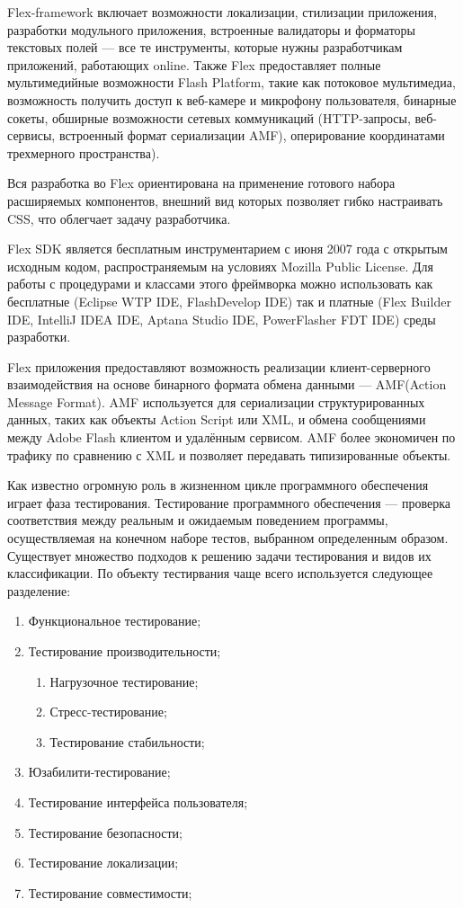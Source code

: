 Flex-framework включает возможности локализации, стилизации приложения, разработки модульного приложения, 
встроенные валидаторы и форматоры текстовых полей --- все те инструменты, которые нужны разработчикам
приложений, работающих online. Также Flex предоставляет полные мультимедийные возможности Flash 
Platform, такие как потоковое мультимедиа, возможность получить доступ к веб-камере и микрофону
пользователя, бинарные сокеты, обширные возможности сетевых коммуникаций (HTTP-запросы, веб-сервисы, 
встроенный формат сериализации AMF), оперирование координатами трехмерного пространства).

Вся разработка во Flex ориентирована на применение готового набора расширяемых компонентов,
внешний вид которых позволяет гибко настраивать CSS, что облегчает задачу разработчика.

Flex SDK является бесплатным инструментарием с июня 2007 года с открытым исходным кодом,
распространяемым на условиях Mozilla Public License. Для работы с процедурами и классами этого фреймворка
можно использовать как бесплатные (Eclipse WTP IDE, FlashDevelop IDE) так и платные
(Flex Builder IDE, IntelliJ IDEA IDE, Aptana Studio IDE, PowerFlasher FDT IDE) среды разработки.

Flex приложения предоставляют возможность реализации клиент-серверного взаимодействия 
на основе бинарного формата обмена данными --- AMF(Action Message Format). AMF
используется для сериализации структурированных данных, таких как объекты Action Script 
или XML, и обмена сообщениями между Adobe Flash клиентом и удалённым сервисом. 
AMF более экономичен по трафику по сравнению с XML и позволяет передавать типизированные объекты.

Как известно огромную роль в жизненном цикле программного обеспечения играет фаза тестирования.
Тестирование программного обеспечения — проверка соответствия между реальным и ожидаемым поведением программы,
осуществляемая на конечном наборе тестов, выбранном определенным образом.
Существует множество подходов к решению задачи тестирования и видов их классификации. По объекту тестирвания чаще всего
используется следующее разделение:

\begin{enumerate}
\item Функциональное тестирование;
\item Тестирование производительности;
\begin{enumerate}
\item Нагрузочное тестирование;
\item Стресс-тестирование;
\item Тестирование стабильности;
\end{enumerate}
\item Юзабилити-тестирование;
\item Тестирование интерфейса пользователя;
\item Тестирование безопасности;
\item Тестирование локализации;
\item Тестирование совместимости;
\end{enumerate}

